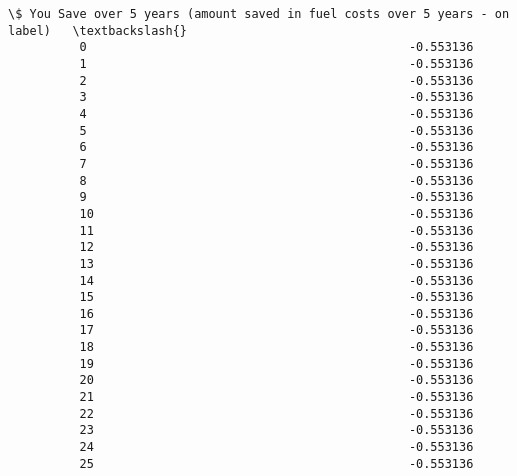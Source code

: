 \documentclass[11pt]{article}
\begin{document}
\begin{Verbatim}[commandchars=\\\{\}]
                \$ You Save over 5 years (amount saved in fuel costs over 5 years - on label)   \textbackslash{}
          0                                             -0.553136                               
          1                                             -0.553136                               
          2                                             -0.553136                               
          3                                             -0.553136                               
          4                                             -0.553136                               
          5                                             -0.553136                               
          6                                             -0.553136                               
          7                                             -0.553136                               
          8                                             -0.553136                               
          9                                             -0.553136                               
          10                                            -0.553136                               
          11                                            -0.553136                               
          12                                            -0.553136                               
          13                                            -0.553136                               
          14                                            -0.553136                               
          15                                            -0.553136                               
          16                                            -0.553136                               
          17                                            -0.553136                               
          18                                            -0.553136                               
          19                                            -0.553136                               
          20                                            -0.553136                               
          21                                            -0.553136                               
          22                                            -0.553136                               
          23                                            -0.553136                               
          24                                            -0.553136                               
          25                                            -0.553136                               

\end{Verbatim}
\end{document}
